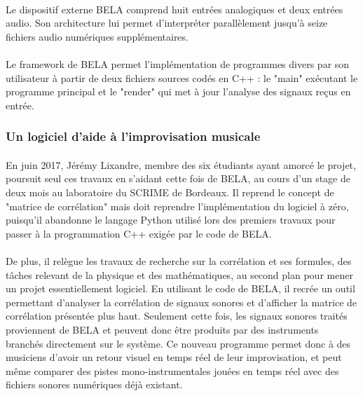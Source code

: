 \paragraph{}
Le dispositif externe BELA comprend huit entrées analogiques et deux
entrées audio. Son architecture lui permet d'interpréter parallèlement
jusqu'à seize fichiers audio numériques supplémentaires.
\paragraph{}
Le framework de BELA permet l'implémentation de programmes divers par
son utilisateur à partir de deux fichiers sources codés en C++ : le
"main" exécutant le programme principal et le "render" qui met à jour
l'analyse des signaux reçus en entrée.

\subsubsection{Un logiciel d'aide à l'improvisation musicale}
\paragraph{}
En juin 2017, Jérémy Lixandre, membre des six étudiants ayant amorcé
le projet, poursuit seul ces travaux en s'aidant cette fois de BELA,
au cours d'un stage de deux mois au laboratoire du SCRIME de
Bordeaux. Il reprend le concept de "matrice de corrélation" mais
doit reprendre l'implémentation du logiciel à zéro, puisqu'il
abandonne le langage Python utilisé lors des premiers travaux pour
passer à la programmation C++ exigée par le code de BELA.
\paragraph{}
De plus, il relègue les travaux de recherche sur la corrélation et ses
formules, des tâches relevant de la physique et des mathématiques, au
second plan pour mener un projet essentiellement logiciel. En
utilisant le code de BELA, il recrée un outil permettant d'analyser la
corrélation de signaux sonores et d'afficher la matrice de corrélation
présentée plus haut. Seulement cette fois, les signaux sonores traités
proviennent de BELA et peuvent donc être produits par des instruments
branchés directement sur le système. Ce nouveau programme permet donc
à des musiciens d'avoir un retour visuel en temps réel de leur
improvisation, et peut même comparer des pistes mono-instrumentales
jouées en temps réel avec des fichiers sonores numériques déjà
existant.

